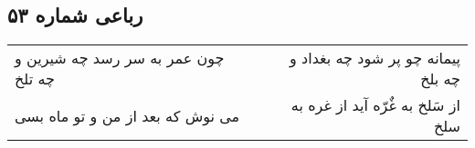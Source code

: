 \begin{center}
\section*{رباعی شماره ۵۳}
\label{sec:sh053}
\begin{longtable}{l p{0.5cm} r}
چون عمر به سر رسد چه شیرین و چه تلخ
&&
پیمانه چو پر شود چه بغداد و چه بلخ
\\
می نوش که بعد از من و تو ماه بسی
&&
از سَلخ به غٌرّه آید از غره به سلخ
\\
\end{longtable}
\end{center}
